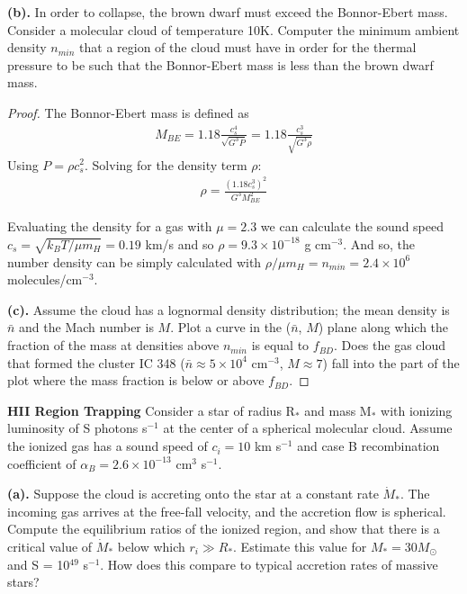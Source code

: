 \documentclass[10pt]{article}
\newenvironment{problem}[2][Problem]{\begin{trivlist}
\item[\hskip \labelsep {\bfseries #1}\hskip \labelsep {\bfseries #2.}]}{\end{trivlist}}
\begin{document}
\noindent\textbf{(b).}
In order to collapse, the brown dwarf must exceed the Bonnor-Ebert mass. Consider a molecular cloud of temperature 10K. Computer the minimum ambient density $n_{min}$ that a region of the cloud must have in order for the thermal pressure to be such that the Bonnor-Ebert mass is less than the brown dwarf mass.
\begin{proof}
The Bonnor-Ebert mass is defined as
\begin{align}
M_{BE} = 1.18 \frac{c_{s}^4}{\sqrt{G^3 P}} = 1.18 \frac{c_{s}^3}{\sqrt{G^3 \rho}}
\end{align}
Using $P = \rho c_{s}^2$. Solving for the density term $\rho$:
\begin{align}
\rho = \frac{(1.18c_{s}^3)^2}{G^3 M_{BE}^2}
\end{align}

Evaluating the density for a gas with $\mu = 2.3$ we can calculate the sound speed $c_{s}=\sqrt{k_{B}T/\mu m_{H}}=0.19$ km/s and so $\rho=9.3 \times 10^{-18}$ g cm$^{-3}$. And so, the number density can be simply calculated with $\rho/\mu m_{H} = n_{min} = 2.4\times10^6$ molecules/cm$^{-3}$.

\noindent\textbf{(c).}
Assume the cloud has a lognormal density distribution; the mean density is $\bar{n}$ and the Mach number is $M$. Plot a curve in the ($\bar{n}$, $M$) plane along which the fraction of the mass at densities above $n_{min}$ is equal to $f_{BD}$. Does the gas cloud that formed the cluster IC 348 ($\bar{n} \approx 5\times10^4$ cm$^{-3}$, $M \approx 7$) fall into the part of the plot where the mass fraction is below or above $f_{BD}$. 




\end{proof}

\begin{problem}{5.1}
\textbf{HII Region Trapping}
Consider a star of radius R$_{*}$ and mass M$_{*}$ with ionizing luminosity of S photons s$^{-1}$ at the center of a spherical molecular cloud. Assume the ionized gas has a sound speed of $c_{i} = 10$ km s$^{-1}$ and case B recombination coefficient of $\alpha_{B} = 2.6 \times 10^{-13}$ cm$^3$ s$^{-1}$.
\end{problem}
\noindent\textbf{(a).}
Suppose the cloud is accreting onto the star at a constant rate $\dot{M}_{*}$. The incoming gas arrives at the free-fall velocity, and the accretion flow is spherical. Compute the equilibrium ratios of the ionized region, and show that there is a critical value of $\dot{M}_{*}$ below which $r_{i} \gg R_{*}$. Estimate this value for $M_{*} = 30 M_{\odot}$ and S = 10$^{49}$ s$^{-1}$. How does this compare to typical accretion rates of massive stars?
\end{document}
